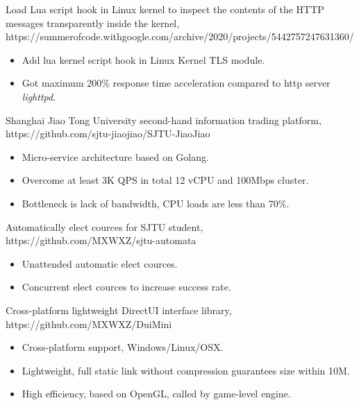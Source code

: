 \documentclass{resume}
\begin{document}
Load Lua script hook in Linux kernel to inspect the contents of the HTTP messages transparently inside the kernel, https://summerofcode.withgoogle.com/archive/2020/projects/5442757247631360/
\begin{itemize}
    \item Add lua kernel script hook in Linux Kernel TLS module.
    \item Got maximum 200\% response time acceleration compared to http server \textit{lighttpd}.
\end{itemize}

Shanghai Jiao Tong University second-hand information trading platform, https://github.com/sjtu-jiaojiao/SJTU-JiaoJiao
\begin{itemize}
    \item Micro-service architecture based on Golang.
    \item Overcome at least 3K QPS in total 12 vCPU and 100Mbps cluster.
    \item Bottleneck is lack of bandwidth, CPU loads are less than 70\%.
\end{itemize}

Automatically elect cources for SJTU student, https://github.com/MXWXZ/sjtu-automata
\begin{itemize}
    \item Unattended automatic elect cources.
    \item Concurrent elect cources to increase success rate.
\end{itemize}

Cross-platform lightweight DirectUI interface library, https://github.com/MXWXZ/DuiMini
\begin{itemize}
    \item Cross-platform support, Windows/Linux/OSX.
    \item Lightweight, full static link without compression guarantees size within 10M.
    \item High efficiency, based on OpenGL, called by game-level engine.
\end{itemize}
\end{document}
